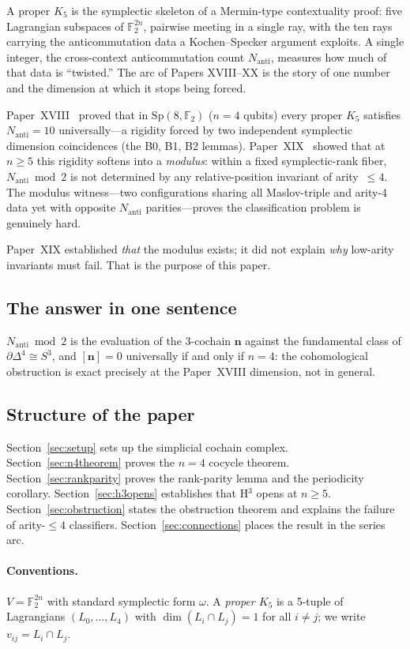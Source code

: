 \documentclass[11pt,a4paper]{article}
\theoremstyle{remark}
\newcommand{\F}{\mathbb{F}}
\newcommand{\Sp}{\mathrm{Sp}}
\newcommand{\Nanti}{N_{\mathrm{anti}}}
\begin{document}
A proper $K_5$ is the symplectic skeleton of a Mermin-type contextuality
proof: five Lagrangian subspaces of $\F_2^{2n}$, pairwise meeting in a single
ray, with the ten rays carrying the anticommutation data a Kochen--Specker
argument exploits.  A single integer, the cross-context anticommutation count
$\Nanti$, measures how much of that data is ``twisted.''  The arc of Papers
XVIII--XX is the story of one number and the dimension at which it stops being
forced.

Paper~XVIII~\cite{PaperXVIII} proved that in $\Sp(8,\F_2)$ ($n=4$ qubits)
every proper $K_5$ satisfies $\Nanti=10$ universally---a rigidity forced by
two independent symplectic dimension coincidences (the B0, B1, B2 lemmas).  Paper~XIX~\cite{PaperXIX} showed that
at $n\ge5$ this rigidity softens into a \emph{modulus}: within a fixed
symplectic-rank fiber, $\Nanti\bmod2$ is not determined by any
relative-position invariant of arity~$\le4$.  The modulus witness---two
configurations sharing all Maslov-triple and arity-4 data yet with opposite
$\Nanti$ parities---proves the classification problem is genuinely hard.

Paper~XIX established \emph{that} the modulus exists; it did not explain
\emph{why} low-arity invariants must fail.  That is the purpose of this paper.

\subsection*{The answer in one sentence}
$\Nanti\bmod2$ is the evaluation of the 3-cochain $\mathbf{n}$ against the
fundamental class of $\partial\Delta^4\cong S^3$, and $[\mathbf{n}]=0$
universally if and only if $n=4$: the cohomological obstruction is exact
precisely at the Paper~XVIII dimension, not in general.

\subsection*{Structure of the paper}
Section~\ref{sec:setup} sets up the simplicial cochain complex.
Section~\ref{sec:n4theorem} proves the $n=4$ cocycle theorem.
Section~\ref{sec:rankparity} proves the rank-parity lemma and the periodicity
corollary.
Section~\ref{sec:h3opens} establishes that H$^3$ opens at $n\ge5$.
Section~\ref{sec:obstruction} states the obstruction theorem and explains the
failure of arity-$\le4$ classifiers.
Section~\ref{sec:connections} places the result in the series arc.

\paragraph{Conventions.}
$V=\F_2^{2n}$ with standard symplectic form $\omega$.  A \emph{proper $K_5$}
is a 5-tuple of Lagrangians $(L_0,\ldots,L_4)$ with $\dim(L_i\cap L_j)=1$
for all $i\ne j$; we write $v_{ij}=L_i\cap L_j$.
\end{document}
